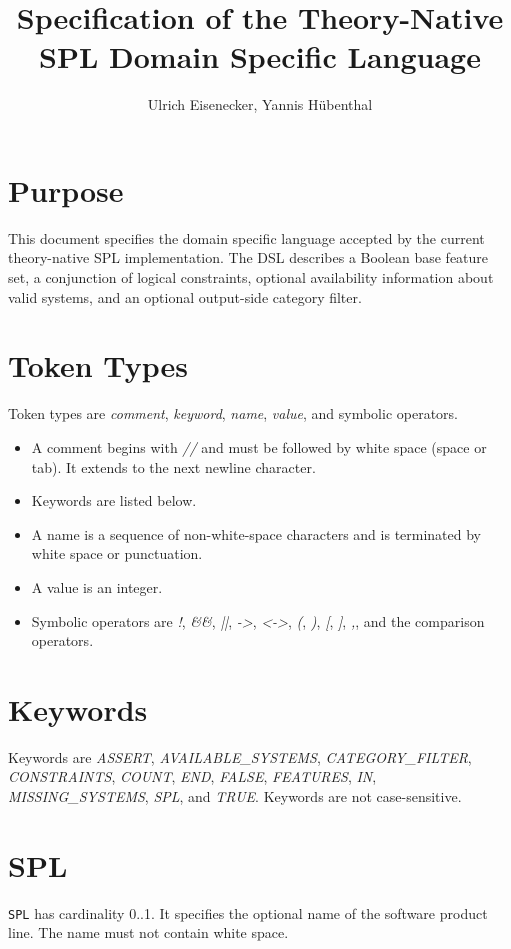 \documentclass[english,10pt,a4paper,draft,onecolumn]{article}
\title{Specification of the Theory-Native SPL Domain Specific Language}
\author{Ulrich Eisenecker, Yannis Hübenthal}
\begin{document}
\maketitle

\section{Purpose}
This document specifies the domain specific language accepted by the current theory-native SPL implementation. The DSL describes a Boolean base feature set, a conjunction of logical constraints, optional availability information about valid systems, and an optional output-side category filter.

\section{Token Types}
Token types are \emph{comment}, \emph{keyword}, \emph{name}, \emph{value}, and symbolic operators.
\begin{itemize}[leftmargin=*]
\item A comment begins with \emph{//} and must be followed by white space (space or tab). It extends to the next newline character.
\item Keywords are listed below.
\item A name is a sequence of non-white-space characters and is terminated by white space or punctuation.
\item A value is an integer.
\item Symbolic operators are \emph{!}, \emph{\&\&}, \emph{||}, \emph{->}, \emph{<->}, \emph{(}, \emph{)}, \emph{[}, \emph{]}, \emph{,}, and the comparison operators.
\end{itemize}

\section{Keywords}
Keywords are \emph{ASSERT}, \emph{AVAILABLE\_SYSTEMS}, \emph{CATEGORY\_FILTER}, \emph{CONSTRAINTS}, \emph{COUNT}, \emph{END}, \emph{FALSE}, \emph{FEATURES}, \emph{IN}, \emph{MISSING\_SYSTEMS}, \emph{SPL}, and \emph{TRUE}. Keywords are not case-sensitive.

\section{SPL}
\texttt{SPL} has cardinality 0..1. It specifies the optional name of the software product line. The name must not contain white space.
\end{document}
